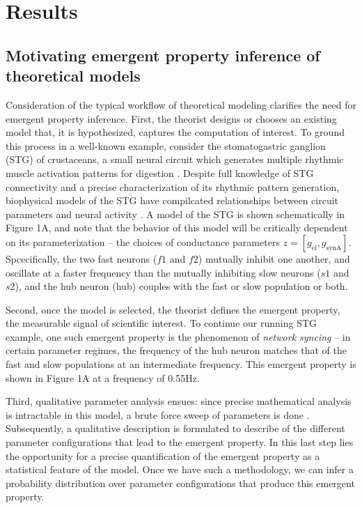 \documentclass[11pt]{article}
\begin{document}
\section{Results}

\subsection{Motivating emergent property inference of theoretical models} \label{results_motivating}

Consideration of the typical workflow of theoretical modeling clarifies the need for emergent property inference.  
First, the theorist designs or chooses an existing model that, it is hypothesized, captures the computation of interest. 
 To ground this process in a well-known example, consider the stomatogastric ganglion (STG) of crustaceans, a small neural circuit which generates multiple rhythmic muscle activation patterns for digestion \cite{marder2002cellular}.
Despite full knowledge of STG connectivity and a precise characterization of its rhythmic pattern generation, biophysical models of the STG have compilcated relationships between circuit parameters and neural activity \cite{prinz2004similar}.
A model of the STG \cite{gutierrez2013multiple} is shown schematically in Figure 1A, and note that the behavior of this model will be critically dependent on its parameterization -- the choices of conductance parameters $z = [g_{\text{el}}, g_{\text{synA}}]$.
Spcecifically, the two fast neurons ($f1$ and $f2$) mutually inhibit one another, and oscillate at a faster frequency than the mutually inhibiting slow neurons ($s1$ and $s2$), and the hub neuron (hub) couples with the fast or slow population or both.  

Second, once the model is selected, the theorist defines the emergent property, the measurable signal of scientific interest.  
To continue our running STG example, one such emergent property is the phenomenon of \emph{network syncing} -- in certain parameter regimes, the frequency of the hub neuron matches that of the fast and slow populations at an intermediate frequency.  This emergent property is shown in Figure 1A at a frequency of 0.55Hz.

Third, qualitative parameter analysis ensues: since precise mathematical analysis is intractable in this model, a brute force sweep of parameters is done \cite{gutierrez2013multiple}.  Subsequently, a qualitative description is formulated to describe of the different parameter configurations that lead to the emergent property.  
In this last step lies the opportunity for a precise quantification of the emergent property as a statistical feature of the model.  Once we have such a methodology, we can infer a probability distribution over parameter configurations that produce this emergent property. 
\end{document}
